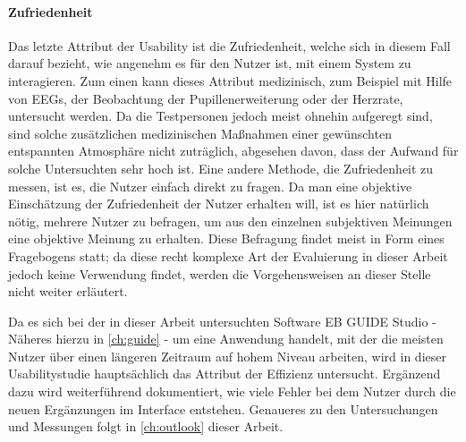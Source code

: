 \paragraph{Zufriedenheit}
Das letzte Attribut der Usability ist die Zufriedenheit, welche sich in diesem Fall darauf bezieht, wie angenehm es für den Nutzer ist, mit einem System zu interagieren.
Zum einen kann dieses Attribut medizinisch, zum Beispiel mit Hilfe von EEGs, der Beobachtung der Pupillenerweiterung oder der Herzrate, untersucht werden.
Da die Testpersonen jedoch meist ohnehin aufgeregt sind, sind solche zusätzlichen medizinischen Maßnahmen einer gewünschten entspannten Atmosphäre nicht zuträglich, abgesehen davon, dass der Aufwand für solche Untersuchten sehr hoch ist.
Eine andere Methode, die Zufriedenheit zu messen, ist es, die Nutzer einfach direkt zu fragen.
Da man eine objektive Einschätzung der Zufriedenheit der Nutzer erhalten will, ist es hier natürlich nötig, mehrere Nutzer zu befragen, um aus den einzelnen subjektiven Meinungen eine objektive Meinung zu erhalten.
Diese Befragung findet meist in Form eines Fragebogens statt; da diese recht komplexe Art der Evaluierung in dieser Arbeit jedoch keine Verwendung findet, werden die Vorgehensweisen an dieser Stelle nicht weiter erläutert.

Da es sich bei der in dieser Arbeit untersuchten Software EB GUIDE Studio - Näheres hierzu in \cref{ch:guide} - um eine Anwendung handelt, mit der die meisten Nutzer über einen längeren Zeitraum auf hohem Niveau arbeiten, wird in dieser Usabilitystudie hauptsächlich das Attribut der Effizienz untersucht. Ergänzend dazu wird weiterführend dokumentiert, wie viele Fehler bei dem Nutzer durch die neuen Ergänzungen im Interface entstehen. Genaueres zu den Untersuchungen und Messungen folgt in \cref{ch:outlook} dieser Arbeit.

